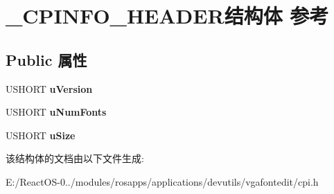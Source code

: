 \hypertarget{struct___c_p_i_n_f_o___h_e_a_d_e_r}{}\section{\+\_\+\+C\+P\+I\+N\+F\+O\+\_\+\+H\+E\+A\+D\+E\+R结构体 参考}
\label{struct___c_p_i_n_f_o___h_e_a_d_e_r}
\subsection*{Public 属性}
\begin{DoxyCompactItemize}
\item 
\mbox{\label{struct___c_p_i_n_f_o___h_e_a_d_e_r_a56293696b20f49074c0c8c455d7500fc}} 
U\+S\+H\+O\+RT {\bfseries u\+Version}
\item 
\mbox{\label{struct___c_p_i_n_f_o___h_e_a_d_e_r_a06b0aee2bedfe81fe92fb96f487ef2c1}} 
U\+S\+H\+O\+RT {\bfseries u\+Num\+Fonts}
\item 
\mbox{\label{struct___c_p_i_n_f_o___h_e_a_d_e_r_a83fd9f1a12b4aefc1bd4f558f2e2a02f}} 
U\+S\+H\+O\+RT {\bfseries u\+Size}
\end{DoxyCompactItemize}


该结构体的文档由以下文件生成\+:\begin{DoxyCompactItemize}
\item 
E\+:/\+React\+O\+S-\/0../modules/rosapps/applications/devutils/vgafontedit/cpi.\+h\end{DoxyCompactItemize}
